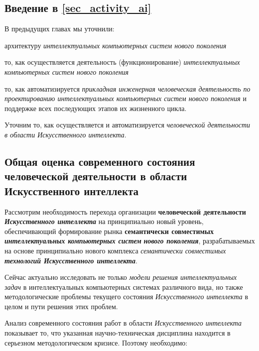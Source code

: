 \subsection*{Введение в \ref{sec_activity_ai}}
В предыдущих главах мы уточнили:

\begin{textitemize}
	\item
	архитектуру \textit{интеллектуальных компьютерных систем нового поколения}
	\item
	то, как осуществляется деятельность (функционирование) \textit{интеллектуальных компьютерных систем нового поколения}
	\item
	то, как автоматизируется \textit{прикладная инженерная человеческая деятельность по проектированию интеллектуальных компьютерных систем нового поколения} и поддержке всех последующих этапов их жизненного цикла.
\end{textitemize}

Уточним то, как осуществляется и автоматизируется  \textit{человеческой деятельности в области Искусственного интеллекта}.

\subsection{Общая оценка современного состояния человеческой деятельности в области Искусственного интеллекта}
\label{subsec_general_assessment_current_state_human_activity}

Рассмотрим необходимость перехода организации \textbf{человеческой деятельности} \textbf{\textit{Искусственного интеллекта}} на принципиально новый уровень, обеспечивающий формирование рынка \textbf{семантически совместимых} \textbf{\textit{интеллектуальных компьютерных систем}} \textbf{\textit{нового поколения}}, разрабатываемых на основе принципиально нового комплекса \textit{семантически совместимых} \textbf{\textit{технологий Искусственного интеллекта}}.

Сейчас актуально исследовать не только \textit{модели решения интеллектуальных задач} в интеллектуальных компьютерных системах различного вида, но также методологические проблемы текущего состояния \textit{Искусственного интеллекта} в целом и пути решения этих проблем.

Анализ современного состояния работ в области \textit{Искусственного интеллекта} показывает то, что указанная научно-техническая дисциплина находится в серьезном методологическом кризисе. Поэтому необходимо:


